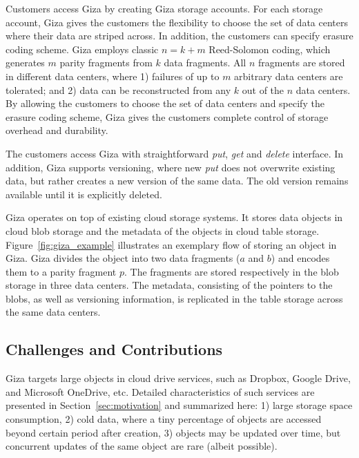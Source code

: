 Customers access Giza by creating Giza storage accounts. For each storage
account, Giza gives the customers the flexibility to choose the set of data centers
where their data are striped across.
In addition, the customers can specify erasure coding scheme. Giza employs classic $n = k + m$
Reed-Solomon coding, which generates $m$ parity fragments from $k$ data
fragments. All $n$ fragments are stored in different data centers, where 1)
failures of up to $m$ arbitrary data centers are tolerated; and 2) data can be
reconstructed from any $k$ out of the $n$ data centers. By allowing the
customers to choose the set of data centers and specify the erasure coding scheme,
Giza gives the customers complete control of storage overhead and durability.

The customers access Giza with straightforward {\em put}, {\em get} and {\em delete} interface. In addition, Giza supports versioning, where new {\em put} does not overwrite existing data, but rather creates a new version of the same data. The old version remains available until it is explicitly deleted.

Giza operates on top of existing cloud storage systems. It stores data
objects in cloud blob storage and the metadata of the objects in cloud table
storage. Figure~\ref{fig:giza_example} illustrates an exemplary flow of storing
an object in Giza.
Giza divides the object into two data fragments ($a$ and $b$) and encodes them to a parity fragment $p$.
The fragments are stored respectively in the blob storage in three data centers. The metadata, consisting of the pointers to the
blobs, as well as versioning information, is replicated in the table storage across the
same data centers.

\subsection{Challenges and Contributions}

Giza targets large objects in cloud drive services, such as
Dropbox, Google Drive, and Microsoft OneDrive, etc.
Detailed characteristics of such services are presented in Section~\ref{sec:motivation}
and summarized here:
1) large storage space consumption,
2) cold data, where a tiny percentage of objects are accessed
beyond certain period after creation,
3) objects may be updated over time, but concurrent updates of the same
object are rare (albeit possible).

